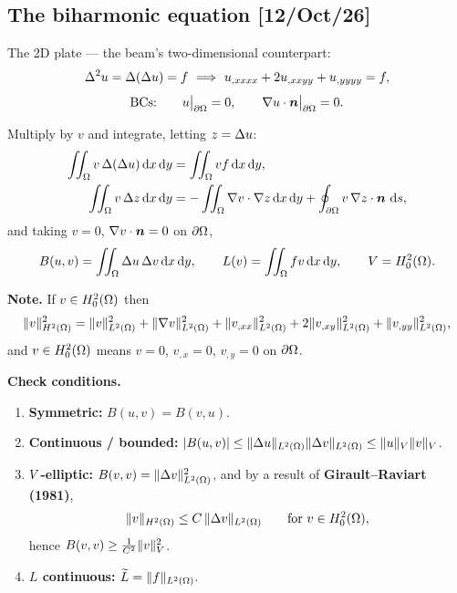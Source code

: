 \subsection*{The biharmonic equation \hfill {\normalfont\small [12/Oct/26]}}

The 2D plate --- the beam's two-dimensional counterpart:
\begin{equation}\label{eq:l13biharm}
  \Delta^{2}u=\Delta(\Delta u)=f
  \ \Longrightarrow\
  u_{,xxxx}+2u_{,xxyy}+u_{,yyyy}=f ,
\end{equation}
\begin{equation}\label{eq:l13biharmbc}
  \text{BCs:}\qquad u\big|_{\partial\Omega}=0,\qquad \nabla u\cdot\bm{n}\big|_{\partial\Omega}=0 .
\end{equation}

Multiply by $v$ and integrate, letting $z=\Delta u$:
\begin{align}
  \iint_{\Omega}v\,\Delta(\Delta u)\,\mathrm{d} x\,\mathrm{d} y&=\iint_{\Omega}vf\,\mathrm{d} x\,\mathrm{d} y,\notag\\
  \iint_{\Omega}v\,\Delta z\,\mathrm{d} x\,\mathrm{d} y
   &=-\iint_{\Omega}\nabla v\cdot\nabla z\,\mathrm{d} x\,\mathrm{d} y
     +\oint_{\partial\Omega}v\,\nabla z\cdot\bm{n}\,\,\mathrm{d} s ,\label{eq:l13biharmibp}
\end{align}
and taking $v=0$, $\nabla v\cdot\bm{n}=0$ on $\partial\Omega$,
\begin{equation}\label{eq:l13biharmweak}
  B(u,v)=\iint_{\Omega}\Delta u\,\Delta v\,\mathrm{d} x\,\mathrm{d} y,
  \qquad
  L(v)=\iint_{\Omega}f v\,\mathrm{d} x\,\mathrm{d} y,
  \qquad
  V=H^{2}_{0}(\Omega).
\end{equation}

\medskip\noindent
\textbf{Note.} If $v\in H^{2}_{0}(\Omega)$ then
\begin{equation}\label{eq:l13H2norm}
  \lVert v\rVert^{2}_{H^{2}(\Omega)}=\lVert v\rVert^{2}_{L^{2}(\Omega)}+\lVert\nabla v\rVert^{2}_{L^{2}(\Omega)}
   +\lVert v_{,xx}\rVert^{2}_{L^{2}(\Omega)}+2\lVert v_{,xy}\rVert^{2}_{L^{2}(\Omega)}
   +\lVert v_{,yy}\rVert^{2}_{L^{2}(\Omega)},
\end{equation}
and $v\in H^{2}_{0}(\Omega)$ means $v=0$, $v_{,x}=0$, $v_{,y}=0$ on $\partial\Omega$.

\noindent
\textbf{Check conditions.}
\begin{enumerate}[label=\arabic*),leftmargin=2.2em,itemsep=3pt]
\item \textbf{Symmetric:} $B(u,v)=B(v,u)$. \cmark
\item \textbf{Continuous / bounded:}
  $|B(u,v)|\le\lVert\Delta u\rVert_{L^{2}(\Omega)}\lVert\Delta v\rVert_{L^{2}(\Omega)}
   \le\lVert u\rVert_{V}\lVert v\rVert_{V}$. \cmark
\item \textbf{$V$-elliptic:} $B(v,v)=\lVert\Delta v\rVert^{2}_{L^{2}(\Omega)}$, and by a
  result of \textbf{Girault--Raviart (1981)},
  \begin{equation}\label{eq:l13girault}
    \lVert v\rVert_{H^{2}(\Omega)}\le C\,\lVert\Delta v\rVert_{L^{2}(\Omega)}
    \qquad\text{for } v\in H^{2}_{0}(\Omega),
  \end{equation}
  hence $B(v,v)\ge\tfrac1{C^{2}}\lVert v\rVert^{2}_{V}$. \cmark
\item \textbf{$L$ continuous:} $\widetilde{L}=\lVert f\rVert_{L^{2}(\Omega)}$. \cmark
\end{enumerate}

